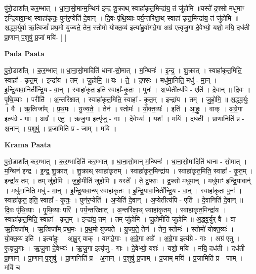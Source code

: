 \documentclass[17pt]{extarticle}
\begin{document}
पु॑रो॒डाशा᳚त् कर॒म्भात् । धा॒ना॒सो॒मान्म॒न्थिन॑ इन्द्र शु॒क्राथ् स्वाहा॑कृत॒मिन्द्रा॑य॒ तं जु॑होमि ॥यस्ते᳚ द्र॒फ्सो मधु॑माꣳ इन्द्रि॒यावा॒न्थ् स्वाहा॑कृतः॒ पुन॑र॒प्येति॑ दे॒वान् । दि॒वः पृ॑थि॒व्याः पर्य॒न्तरि॑क्षा॒थ् स्वाहा॑ कृत॒मिन्द्रा॑य॒ तं जु॑होमि ॥ अ॒द्ध्व॒र्युर्वा ऋ॒त्विजां᳚ प्रथ॒मो यु॑ज्यते॒ तेन॒ स्तोमो॑ योक्त॒व्य॑ इत्या॑हु॒र्वाग॑ग्रे॒गा अग्र॑ एत्वृजु॒गा दे॒वेभ्यो॒ यशो॒ मयि॒ दध॑ती प्रा॒णान् प॒शुषु॑ प्र॒जां मयि॑- [  ] \newline

\textbf{Pada Paata} \newline

पु॒रो॒डाशा᳚त् । क॒र॒म्भात् ॥ धा॒ना॒सो॒मादिति॑ धाना-सो॒मात् । म॒न्थिनः॑ । इ॒न्द्र॒ । शु॒क्रात् । स्वाहा॑कृत॒मिति॒ स्वाहा᳚ - कृ॒त॒म् । इन्द्रा॑य । तम् । जु॒हो॒मि॒ ॥ यः । ते॒ । द्र॒फ्सः । मधु॑मा॒निति॒ मधु॑ - मा॒न् । इ॒न्द्रि॒यावा॒निती᳚न्द्रि॒य - वा॒न् । स्वाहा॑कृत॒ इति स्वाहा᳚-कृ॒तः॒ । पुनः॑ । अ॒प्येतीत्य॑पि - एति॑ । दे॒वान् ॥ दि॒वः । पृ॒थि॒व्याः । परीति॑ । अ॒न्तरि॑क्षात् । स्वाहा॑कृत॒मिति॒ स्वाहा᳚ - कृ॒त॒म् । इन्द्रा॑य । तम् । जु॒हो॒मि॒ ॥ अ॒द्ध्व॒र्युः । वै । ऋ॒त्विजा᳚म् । प्र॒थ॒मः । यु॒ज्य॒ते॒ । तेन॑ । स्तोमः॑ । यो॒क्त॒व्यः॑ । इति॑ । आ॒हुः॒ । वाक् । अ॒ग्रे॒गा इत्य॑ग्रे - गाः । अग्र᳚ । ए॒तु॒ । ऋ॒जु॒गा इत्यृ॑जु - गाः । दे॒वेभ्यः॑ । यशः॑ । मयि॑ । दध॑ती । प्रा॒णानिति॑ प्र - अ॒नान् । प॒शुषु॑ । प्र॒जामिति॑ प्र - जाम् । मयि॑ ।  \newline


\textbf{Krama Paata} \newline

पु॒रो॒डाशा᳚त् कर॒म्भात् । क॒र॒म्भादिति॑ कर॒म्भात् ॥ धा॒ना॒सो॒मान् म॒न्थिनः॑ । धा॒ना॒सो॒मादिति॑ धाना - सो॒मात् । म॒न्थिन॑ इन्द्र । इ॒न्द्र॒ शु॒क्रात् । शु॒क्राथ् स्वाहा॑कृतम् । स्वाहा॑कृत॒मिन्द्रा॑य । स्वाहा॑कृत॒मिति॒ स्वाहा᳚ - कृ॒त॒म् । इन्द्रा॑य॒ तम् । तम् जु॑होमि । जु॒हो॒मीति॑ जुहोमि ॥ यस्ते᳚ । ते॒ द्र॒फ्सः । द्र॒फ्सो मधु॑मान् । मधु॑माꣳ इन्द्रि॒यावान्॑ । मधु॑मा॒निति॒ मधु॑ - मा॒न्॒ । इ॒न्द्रि॒यावा॒न्थ् स्वाहा॑कृतः । इ॒न्द्रि॒यावा॒निती᳚न्द्रि॒य - वा॒न्॒ । स्वाहा॑कृतः॒ पुनः॑ । स्वाहा॑कृत॒ इति॒ स्वाहा᳚ - कृ॒तः॒ । पुन॑र॒प्येति॑ । अ॒प्येति॑ दे॒वान् । अ॒प्येतीत्य॑पि - एति॑ । दे॒वानिति॑ दे॒वान् ॥ दि॒वः पृ॑थि॒व्याः । पृ॒थि॒व्याः परि॑ । पर्य॒न्तरि॑क्षात् । अ॒न्तरि॑क्षा॒थ् स्वाहा॑कृतम् । स्वाहा॑कृत॒मिन्द्रा॑य । स्वाहा॑कृत॒मिति॒ स्वाहा᳚ - कृ॒त॒म् । इन्द्रा॑य॒ तम् । तम् जु॑होमि । जु॒हो॒मीति॑ जुहोमि ॥ अ॒द्ध्व॒र्युर् वै । वा ऋ॒त्विजा᳚म् । ऋ॒त्विजा᳚म् प्रथ॒मः । प्र॒थ॒मो यु॑ज्यते । यु॒ज्य॒ते॒ तेन॑ । तेन॒ स्तोमः॑ । स्तोमो॑ योक्त॒व्यः॑ । यो॒क्त॒व्य॑ इति॑ । इत्या॑हुः । आ॒हु॒र् वाक् । वाग॑ग्रे॒गाः । अ॒ग्रे॒गा अग्रे᳚ । अ॒ग्रे॒गा इत्य॑ग्रे - गाः । अग्र॑ एतु । ए॒त्वृ॒जु॒गाः । ऋ॒जु॒गा दे॒वेभ्यः॑ । ऋ॒जु॒गा इत्यृ॑जु - गाः । दे॒वेभ्यो॒ यशः॑ । यशो॒ मयि॑ । मयि॒ दध॑ती । दध॑ती प्रा॒णान् । प्रा॒णान् प॒शुषु॑ । प्रा॒णानिति॑ प्र - अ॒नान् । प॒शुषु॑ प्र॒जाम् । प्र॒जाम् मयि॑ । प्र॒जामिति॑ प्र - जाम् । मयि॑ च \newline
\end{document}
